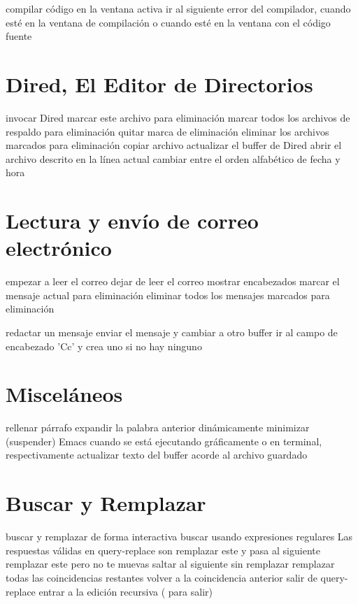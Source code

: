  compilar c{\'o}digo en la ventana activa
 ir al siguiente error del compilador, cuando est{\'e}
  en la ventana de compilaci{\'o}n o
 cuando est{\'e} en la ventana con el c{\'o}digo fuente

\section{Dired, El Editor de Directorios}

 invocar Dired
 marcar este archivo para eliminaci{\'o}n
\key{\~{}} marcar todos los archivos de respaldo para eliminaci{\'o}n
 quitar marca de eliminaci{\'o}n
 eliminar los archivos marcados para eliminaci{\'o}n
 copiar archivo
 actualizar el buffer de Dired
 abrir el archivo descrito en la l{\'i}nea actual
 cambiar entre el orden alfab{\'e}tico de fecha y hora

\section{Lectura y env{\'i}o de correo electr{\'o}nico}

 empezar a leer el correo
 dejar de leer el correo
 mostrar encabezados
 marcar el mensaje actual para eliminaci{\'o}n
 eliminar todos los mensajes marcados para eliminaci{\'o}n

 redactar un mensaje
 enviar el mensaje y cambiar a otro buffer
 ir al campo de encabezado 'Cc' y crea uno
  si no hay ninguno

\section{Miscel{\'a}neos}

 rellenar p{\'a}rrafo
 expandir la palabra anterior din{\'a}micamente
 minimizar (suspender) Emacs cuando se est{\'a} ejecutando
  gr{\'a}ficamente o en terminal, respectivamente
 actualizar texto del buffer acorde al archivo
  guardado

\section{Buscar y Remplazar}

 buscar y remplazar de forma interactiva
 buscar usando expresiones regulares
\askip
Las respuestas v{\'a}lidas en query-replace son
\askip
{} remplazar este y pasa al siguiente
\key{,} remplazar este pero no te muevas
 saltar al siguiente sin remplazar
\key{!} remplazar todas las coincidencias restantes
\key{\^{}} volver a la coincidencia anterior
 salir de query-replace
 entrar a la edici{\'o}n recursiva ( para salir)

